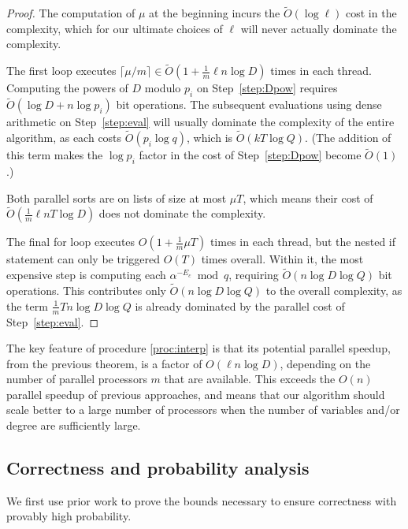 \documentclass[letterpaper,10pt]{article}
\newcommand{\softoh}{\ensuremath{\widetilde{O}}}
\begin{document}
\begin{proof}
  The computation of $\mu$ at the beginning incurs the $\softoh(\log \ell)$
  cost in the complexity, which for our ultimate choices of $\ell$ will
  never actually dominate the complexity.

  The first loop executes 
  $\lceil \mu/m \rceil \in \softoh(1 + \tfrac{1}{m}\ell n \log D)$
  times in each thread.
  Computing the powers of $D$ modulo $p_i$ on Step~\ref{step:Dpow}
  requires $\softoh(\log D + n\log p_i)$ bit operations. The subsequent
  evaluations using dense arithmetic on Step~\ref{step:eval} will
  usually dominate the complexity of the entire algorithm, as each costs
  $\softoh(p_i \log q)$, which is $\softoh(k T \log Q)$.
  (The addition of this term makes the $\log p_i$ factor in the cost of
  Step~\ref{step:Dpow} become $\softoh(1)$.)

  Both parallel sorts are on lists of size at most $\mu T$, which means
  their cost of $\softoh(\tfrac{1}{m} \ell n T \log D)$ does not
  dominate the complexity.

  The final for loop executes $O(1 + \tfrac{1}{m} \mu T)$ times in each
  thread, but the nested if statement can only be triggered $O(T)$ times
  overall. Within it, the most expensive step is computing each
  $\alpha^{-E_c} \bmod q$, requiring $\softoh(n\log D \log Q)$
  bit operations. This contributes only
  $\softoh(n\log D \log Q)$ to the overall complexity, as
  the term $\frac{1}{m}T n\log D \log Q$ is already dominated by the
  parallel cost of Step~\ref{step:eval}.
\end{proof}

The key feature of procedure \ref{proc:interp} is that its potential
parallel speedup, from the previous theorem, is a factor of 
$O(\ell n \log D)$, depending on the number of parallel processors $m$
that are available. This exceeds the $O(n)$ parallel speedup of previous
approaches, and means that our algorithm should scale better to a large
number of processors when the number of variables and/or degree are
sufficiently large.

\subsection{Correctness and probability analysis}

We first use prior work to prove the bounds necessary to ensure
correctness with provably high probability. 
\end{document}
